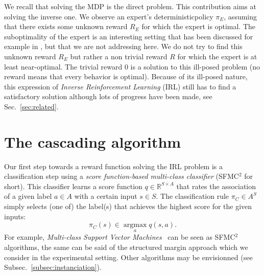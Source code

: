 \documentclass[smallextended]{svjour3}
\newcommand{\argmax}{\operatorname*{argmax}} %
\begin{document}
We recall that solving the MDP is the direct problem. This contribution aims at solving the inverse one. We observe an expert's deterministic\footnotemark[\value{footnote}] policy $\pi_E$, assuming that there exists some unknown reward $R_E$ for which the expert is optimal. The suboptimality of the expert is an interesting setting that has been discussed for example in \cite{melo2010analysis,syed2010reduction}, but that we are not addressing here. We do not try to find this unknown reward $R_E$ but rather a non trivial reward $R$ for which the expert is at least near-optimal. The trivial reward $0$ is a solution to this ill-posed problem (no reward means that every behavior is optimal). Because of its ill-posed nature, this expression of \emph{Inverse Reinforcement Learning} (IRL) still has to find a satisfactory solution although lots of progress have been made, see Sec.~\ref{sec:related}.
\section{The cascading algorithm}
\label{sec:algo}
Our first step towards a reward function solving the IRL problem is a classification step using a \emph{score function-based multi-class classifier} (SFMC$^2$ for short). This classifier learns a score function $q\in\mathbb{R}^{S\times A}$ that rates the association of a given label $a\in A$ with a certain input $s\in S$. The classification rule $\pi_C\in A^S$ simply selects (one of) the label(s) that achieves the highest score for the given inputs:
\begin{equation}
  \label{eq:greedy2}
\pi_C(s) \in \argmax_a q(s,a).
\end{equation}
For example, \emph{Multi-class Support Vector Machines}~\cite{guermeur2011generic} can be seen as SFMC$^2$ algorithms, the same can be said of the structured margin approach \cite{taskar2005learning} which we consider in the experimental setting. Other algorithms may be envisionned (see Subsec.~\ref{subsec:instanciation}). 
\end{document}
